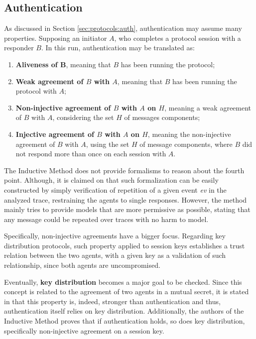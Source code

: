 \subsection{Authentication}
As discussed in Section \ref{sec:protocols:auth}, authentication may assume many properties. Supposing an initiator $A$, who completes a protocol session with a responder $B$. In this run, authentication may be translated as:

\begin{enumerate}
  \item \textbf{Aliveness of B}, meaning that $B$ has been running the protocol;
  \item \textbf{Weak agreement of $B$ with $A$}, meaning that $B$ has been running the protocol with $A$;
  \item \textbf{Non-injective agreement of $B$ with $A$ on $H$}, meaning a weak agreement of $B$ with $A$, considering the set $H$ of messages components;
  \item \textbf{Injective agreement of $B$ with $A$ on $H$}, meaning the non-injective agreement of $B$ with $A$, using the set $H$ of message components, where $B$ did not respond more than once on each session with $A$.
\end{enumerate}

The Inductive Method does not provide formalisms to reason about the fourth point. Although, it is claimed on \cite{bella-book} that such formalization can be easily constructed by simply verification of repetition of a given event \textit{ev} in the analyzed trace, restraining the agents to single responses. However, the method mainly tries to provide models that are more permissive as possible, stating that any message could be repeated over traces with no harm to model.

Specifically, non-injective agreements have a bigger focus. Regarding key distribution protocols, such property applied to session keys establishes a trust relation between the two agents, with a given key as a validation of such relationship, since both agents are uncompromised.

Eventually, \textbf{key distribution} becomes a major goal to be checked. Since this concept is related to the agreement of two agents in a mutual secret, it is stated in \cite{auth:bellare-rogaway} that this property is, indeed, stronger than authentication and thus, authentication itself relies on key distribution. Additionally, the authors of the Inductive Method proves that if authentication holds, so does key distribution, specifically non-injective agreement on a session key.
